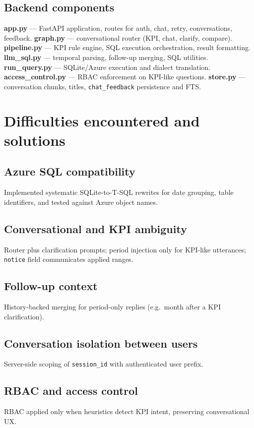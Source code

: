 \subsection{Backend components}
\textbf{app.py} --- FastAPI application, routes for auth, chat, retry, conversations, feedback. \textbf{graph.py} --- conversational router (KPI, chat, clarify, compare). \textbf{pipeline.py} --- KPI rule engine, SQL execution orchestration, result formatting. \textbf{llm\_sql.py} --- temporal parsing, follow-up merging, SQL utilities. \textbf{run\_query.py} --- SQLite/Azure execution and dialect translation. \textbf{access\_control.py} --- RBAC enforcement on KPI-like questions. \textbf{store.py} --- conversation chunks, titles, \texttt{chat\_feedback} persistence and FTS.

\section{Difficulties encountered and solutions}
\subsection{Azure SQL compatibility}
Implemented systematic SQLite-to-T-SQL rewrites for date grouping, table identifiers, and tested against Azure object names.

\subsection{Conversational and KPI ambiguity}
Router plus clarification prompts; period injection only for KPI-like utterances; \texttt{notice} field communicates applied ranges.

\subsection{Follow-up context}
History-backed merging for period-only replies (e.g.\ month after a KPI clarification).

\subsection{Conversation isolation between users}
Server-side scoping of \texttt{session\_id} with authenticated user prefix.

\subsection{RBAC and access control}
RBAC applied only when heuristics detect KPI intent, preserving conversational UX.


